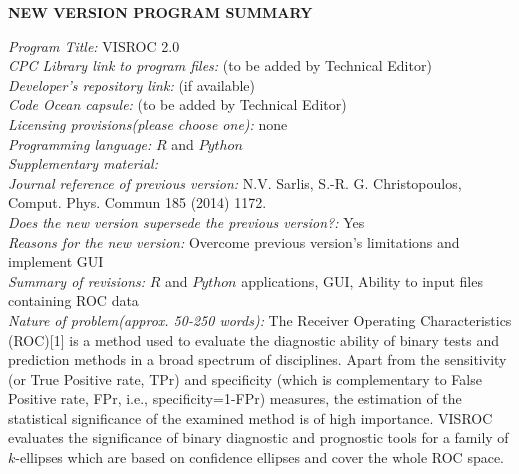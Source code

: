 \documentclass[preprint,12pt]{elsarticle}
\begin{document}


{\bf NEW VERSION PROGRAM SUMMARY}

\begin{small}
\noindent
{\em Program Title:}     VISROC 2.0                                       \\
{\em CPC Library link to program files:} (to be added by Technical Editor) \\
{\em Developer's repository link:} (if available) \\
{\em Code Ocean capsule:} (to be added by Technical Editor)\\
{\em Licensing provisions(please choose one):} none  \\
{\em Programming language:}   $R$ and $Python$                                 \\
{\em Supplementary material:}                                 \\
{\em Journal reference of previous version:}  N.V. Sarlis, S.-R. G. Christopoulos, Comput. Phys. Commun 185 (2014) 1172.                \\
{\em Does the new version supersede the previous version?:} Yes   \\
{\em Reasons for the new version:} Overcome previous version's limitations and implement GUI\\
{\em Summary of revisions:} $R$ and $Python$ applications, GUI, Ability to input files containing ROC data\\
{\em Nature of problem(approx. 50-250 words):} The Receiver Operating Characteristics (ROC)[1] is a method used to evaluate the diagnostic ability of binary tests and prediction methods in a broad spectrum of disciplines. Apart from the sensitivity (or True Positive rate, TPr) and specificity (which is complementary to False Positive rate, FPr, i.e., specificity=1-FPr) measures, the estimation of the statistical significance of the examined method is of high importance. VISROC evaluates the significance of binary diagnostic and prognostic tools for a family of $k$-ellipses which are based on confidence ellipses and cover the whole ROC space. \\

\end{small}
\end{document}
